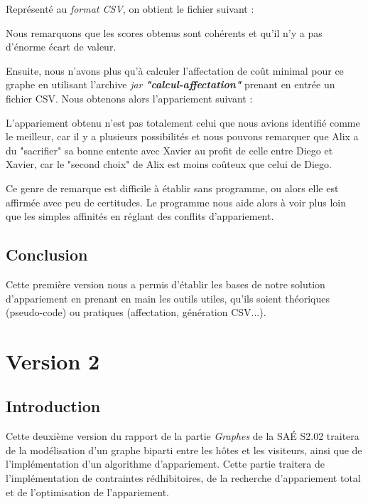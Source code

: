 \documentclass{mytex}
\begin{document}
\vspace{4.5cm}%
Représenté au \emph{format CSV}, on obtient le fichier suivant :

\vspace{8.5cm}%

Nous remarquons que les scores obtenus sont cohérents et qu'il n'y a pas d'énorme écart de valeur.

Ensuite, nous n'avons plus qu'à calculer l'affectation de coût minimal pour ce graphe en utilisant l'archive \emph{jar} \textbf{\emph{"calcul-affectation"}} prenant en entrée un fichier CSV.
Nous obtenons alors l'appariement suivant :

L'appariement obtenu n'est pas totalement celui que nous avions identifié comme le meilleur, car il y a plusieurs possibilités et nous pouvons remarquer que Alix a du "sacrifier" sa bonne entente avec Xavier au profit de celle entre Diego et Xavier, car le "second choix" de Alix est moins coûteux que celui de Diego.

Ce genre de remarque est difficile à établir sans programme, ou alors elle est affirmée avec peu de certitudes. Le programme nous aide alors à voir plus loin que les simples affinités en réglant des conflits d'appariement.

\subsection{Conclusion}
Cette première version nous a permis d'établir les bases de notre solution d'appariement en prenant en main les outils utiles, qu'ils soient théoriques (pseudo-code) ou pratiques (affectation, génération CSV...).

\section{Version 2}

\subsection{Introduction}
Cette deuxième version du rapport de la partie \emph{Graphes} de la SAÉ S2.02 traitera de la modélisation d'un graphe biparti entre les hôtes et les visiteurs, ainsi que de l'implémentation d'un algorithme d'appariement.
Cette partie traitera de l'implémentation de contraintes rédhibitoires, de la recherche d'appariement total et de l'optimisation de l'appariement.
\end{document}
